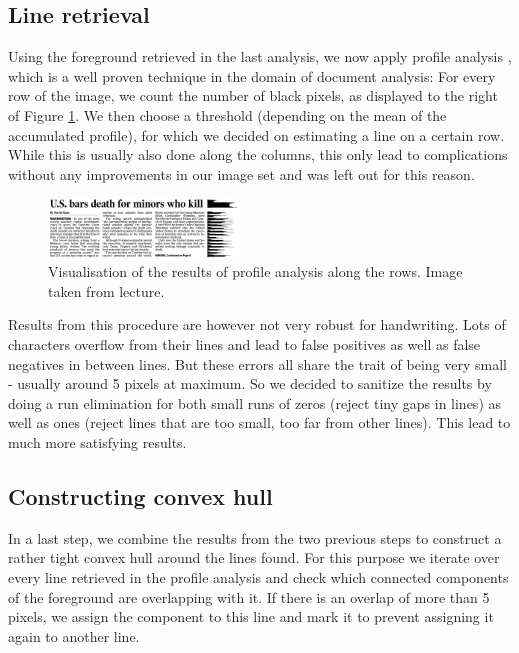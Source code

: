 \documentclass[conference]{IEEEtran}
\begin{document}
\subsection{Line retrieval}
Using the foreground retrieved in the last analysis, we now apply profile analysis  \cite{ciardiello1988experimental}, which is a well proven technique in the domain of document analysis:
For every row of the image, we count the number of black pixels, as displayed to the right of Figure \ref{fig:profile_analysis}. 
We then choose a threshold (depending on the mean of the accumulated profile),
for which we decided on estimating a line on a certain row. 
While this is usually also done along the columns, 
this only lead to complications without any improvements in our image set and was left out for this reason.
\begin{figure}[ht!]%
\centering
\includegraphics[width=0.45\textwidth]{profile_analysis}
\caption{Visualisation of the results of profile analysis along the rows. Image taken from lecture.}
\label{fig:profile_analysis}
\end{figure}
Results from this procedure are however not very robust for handwriting.
Lots of characters overflow from their lines and lead to false positives as well
as false negatives in between lines. 
But these errors all share the trait of being very small 
- usually around 5 pixels at maximum. 
So we decided to sanitize the results by doing a run elimination for both small runs of zeros 
(reject tiny gaps in lines) as well as ones 
(reject lines that are too small, too far from other lines).
This lead to much more satisfying results.

\subsection{Constructing convex hull}
In a last step, we combine the results from the two previous steps
to construct a rather tight convex hull around the lines found.
For this purpose we iterate over every line retrieved in the profile
analysis and check 
which connected components of the foreground are overlapping with it.
If there is an overlap of more than 5 pixels, 
we assign the component to this line and mark it to prevent assigning
it again to another line.
\end{document}
